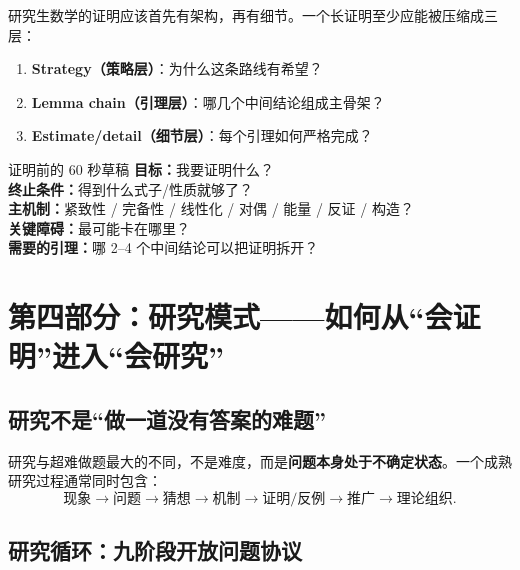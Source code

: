 \documentclass[11pt,a4paper]{ctexart}
\newcommand{\concept}[1]{\textbf{\color{deepblue}#1}}
\newcommand{\keyword}[1]{\textbf{#1}}
\begin{document}
研究生数学的证明应该首先有架构，再有细节。一个长证明至少应能被压缩成三层：

\begin{enumerate}
  \item \keyword{Strategy（策略层）}：为什么这条路线有希望？
  \item \keyword{Lemma chain（引理层）}：哪几个中间结论组成主骨架？
  \item \keyword{Estimate/detail（细节层）}：每个引理如何严格完成？
\end{enumerate}

\begin{templatebox}{证明前的 60 秒草稿}
\textbf{目标：}我要证明什么？\\
\textbf{终止条件：}得到什么式子/性质就够了？\\
\textbf{主机制：}紧致性 / 完备性 / 线性化 / 对偶 / 能量 / 反证 / 构造？\\
\textbf{关键障碍：}最可能卡在哪里？\\
\textbf{需要的引理：}哪 2--4 个中间结论可以把证明拆开？
\end{templatebox}

\section{第四部分：研究模式——如何从“会证明”进入“会研究”}

\subsection{研究不是“做一道没有答案的难题”}

研究与超难做题最大的不同，不是难度，而是\concept{问题本身处于不确定状态}。一个成熟研究过程通常同时包含：
\[
\text{现象}\to\text{问题}\to\text{猜想}\to\text{机制}\to\text{证明/反例}\to\text{推广}\to\text{理论组织}.
\]

\subsection{研究循环：九阶段开放问题协议}
\end{document}
